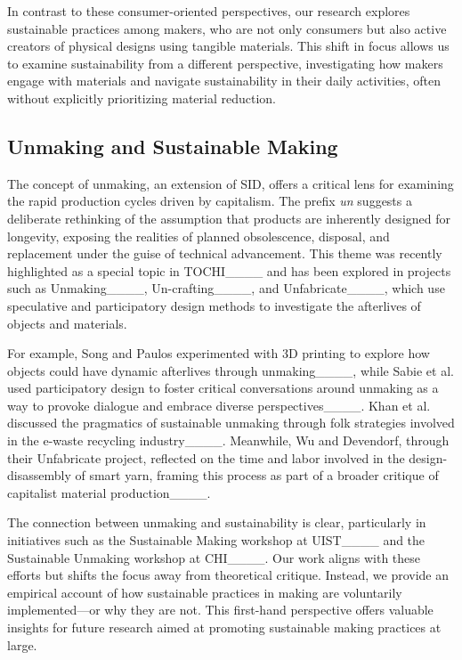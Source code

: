 In contrast to these consumer-oriented perspectives, our research explores sustainable practices among makers, who are not only consumers but also active creators of physical designs using tangible materials. This shift in focus allows us to examine sustainability from a different perspective, investigating how makers engage with materials and navigate sustainability in their daily activities, often without explicitly prioritizing material reduction.

\subsection{Unmaking and Sustainable Making}

The concept of unmaking, an extension of SID, offers a critical lens for examining the rapid production cycles driven by capitalism. 
The prefix \textit{un} suggests a deliberate rethinking of the assumption that products are inherently designed for longevity, exposing the realities of planned obsolescence, disposal, and replacement under the guise of technical advancement. 
This theme was recently highlighted as a special topic in TOCHI____ and has been explored in projects such as Unmaking____, Un-crafting____, and Unfabricate____, which use speculative and participatory design methods to investigate the afterlives of objects and materials.


For example, Song and Paulos experimented with 3D printing to explore how objects could have dynamic afterlives through unmaking____, while Sabie et al. used participatory design to foster critical conversations around unmaking as a way to provoke dialogue and embrace diverse perspectives____. 
Khan et al. discussed the pragmatics of sustainable unmaking through folk strategies involved in the e-waste recycling industry____. Meanwhile, Wu and Devendorf, through their Unfabricate project, reflected on the time and labor involved in the design-disassembly of smart yarn, framing this process as part of a broader critique of capitalist material production____.

The connection between unmaking and sustainability is clear, particularly in initiatives such as the Sustainable Making workshop at UIST____ and the Sustainable Unmaking workshop at CHI____. 
Our work aligns with these efforts but shifts the focus away from theoretical critique. 
Instead, we provide an empirical account of how sustainable practices in making are voluntarily implemented—or why they are not. 
This first-hand perspective offers valuable insights for future research aimed at promoting sustainable making practices at large.

